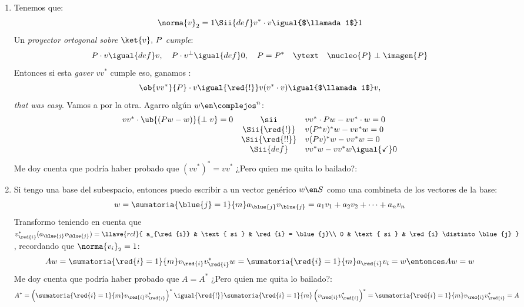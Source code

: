 \begin{enumerate}[label=(\alph*)]
  \item\label{ej-17:itema} Tenemos que:
        $$
          \norma{v}_2 = 1
          \Sii{def}
          v^* \cdot v \igual{$\llamada1$} 1
        $$
        Un \textit{proyector ortogonal sobre $\ket{v},\, P$ cumple}:
        $$
          P \cdot v \igual{def} v
          , \quad
          P \cdot v^\perp \igual{def} 0
          , \quad
          P = P^*
          \quad \ytext \quad
          \nucleo{P}
          \perp
          \imagen{P}
        $$
        Entonces si esta \textit{gaver} $vv^*$ cumple eso, ganamos {\tiny\poo}:
        $$
          \ob{vv^*}{P} \cdot v \igual{\red{!}}
          v (v^* \cdot v) \igual{$\llamada1$} v,
        $$
        \textit{that was easy}. Vamos a por la otra. Agarro algún $w \en \complejos^n$:
        $$
          \begin{array}{rcl}
            vv^* \cdot \ub{(Pw - w)}{\perp v} = 0
             & \sii           &
            vv^* \cdot Pw - vv^* \cdot w = 0 \\
             & \Sii{\red{!}}  &
            v(P^*v)^* w - vv^*  w = 0        \\
             & \Sii{\red{!!}} &
            v(Pv)^* w - vv^*  w = 0          \\
             & \Sii{def}      &
            vv^* w - vv^*  w \igual{\checkmark} 0
          \end{array}
        $$
        Me doy cuenta que podría haber probado que $(vv^*)^* = vv^*$ ¿Pero quien me quita lo bailado?:

  \item Si tengo una base del subespacio, entonces puedo escribir a un vector genérico $w \en S$ como una combineta de
        los vectores de la base:
        $$
          w = \sumatoria{\blue{j} = 1}{m} a_{\blue{j}} v_{\blue{j}} = a_1 v_1 + a_2  v_2 + \cdots + a_n v_n
        $$
        Transformo teniendo en cuenta que
        $
          v_{\red{i}}^* (a_{\blue{j}} v_{\blue{j}}) =
          \llave{rcl}{
            a_{\red{i}} & \text{ si } & \red{i} = \blue{j}\\
            0 & \text{ si } & \red{i} \distinto \blue{j}
          }
        $, recordando que $\norma{v_i}_2 = 1$:
        $$
          Aw = \sumatoria{\red{i}=1}{m}v_{\red{i}}v_{\red{i}}^* w = \sumatoria{\red{i} = 1}{m} a_{\red{i}}v_i = w
          \entonces Aw = w
        $$
        Me doy cuenta que podría haber probado que $A = A^*$ ¿Pero quien me quita lo bailado?:
        $$
          A^* =
          \left(\sumatoria{\red{i}=1}{m}v_{\red{i}}v_{\red{i}}^*\right)^*
          \igual{\red{!}}
          \sumatoria{\red{i}=1}{m}\left(v_{\red{i}}v_{\red{i}}^*\right)^* =
          \sumatoria{\red{i}=1}{m}v_{\red{i}}v_{\red{i}}^* = A
        $$


\end{enumerate}
